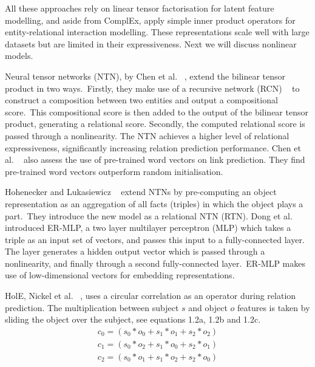 \noindent All these approaches rely on linear tensor factorisation for latent feature modelling, and aside from ComplEx, apply simple inner product operators for entity-relational interaction modelling. These representations scale well with large datasets but are limited in their expressiveness. Next we will discuss nonlinear models. \par

\noindent Neural tensor networks (NTN), by Chen et al. \unskip~\citep{socher2013reasoning}, extend the bilinear tensor product in two ways.\ Firstly, they make use of a recursive network (RCN) \unskip~\citep{socher2012semantic} to construct a composition between two entities and output a compositional score.\ This compositional score is then added to the output of the bilinear tensor product, generating a relational score. Secondly, the computed relational score is passed through a nonlinearity. The NTN achieves a higher level of relational expressiveness, significantly increasing relation prediction performance.  Chen et al. \unskip~\citep{socher2013reasoning} also assess the use of pre-trained word vectors on link prediction. They find pre-trained word vectors outperform random initialisation. \par

\noindent Hohenecker and Lukasiewicz \unskip~\citep{hohenecker2017deep} extend NTNs by pre-computing an object representation as an aggregation of all facts (triples) in which the object plays a part.\ They introduce the new model as a relational NTN (RTN). Dong et al. \unskip~\citep{dong2014knowledge} introduced ER-MLP, a two layer multilayer perceptron (MLP) which takes a triple as an input set of vectors, and passes this input to a fully-connected layer. The layer generates a hidden output vector which is passed through a nonlinearity, and finally through a second fully-connected layer.\ ER-MLP makes use of low-dimensional vectors for embedding representations. \par

\noindent HolE, Nickel et al. \unskip~\citep{nickel2016holographic}, uses a circular correlation as an operator during relation prediction. The multiplication between subject $ s $ and object $ o $ features is taken by sliding the object over the subject, see equations 1.2a, 1.2b and 1.2c. 
\begin{subequations}
	\begin{gather}
		c_0 =  (s_0*o_0 + s_1*o_1 + s_2*o_2) \\
		c_1 =  (s_0*o_2 + s_1*o_0 + s_2*o_1) \\
		c_2 =  (s_0*o_1 + s_1*o_2 + s_2*o_0) 
	\end{gather}
\end{subequations}

